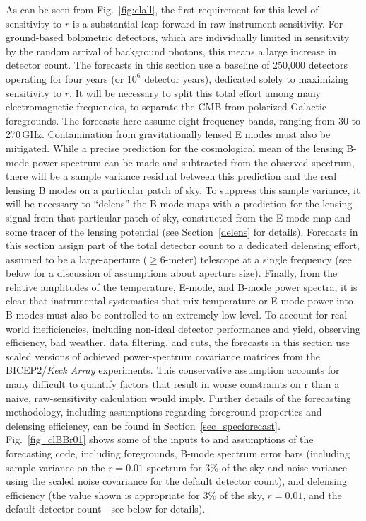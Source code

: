 As can be seen from Fig.~\ref{fig:clall}, the first requirement for this level of sensitivity to $r$ is a substantial leap forward in raw instrument sensitivity. 
For ground-based bolometric detectors, which are individually limited in sensitivity by the random arrival of background photons, this means a large increase in detector count. 
The forecasts in this section use a baseline of 250,000 detectors operating for four years (or $10^6$ detector years), dedicated solely to maximizing sensitivity to $r$. 
It will be necessary to split this total effort among many electromagnetic frequencies, to separate the CMB from polarized Galactic foregrounds. %
The forecasts here assume eight frequency bands, ranging from 30 to 270\,GHz.
Contamination from gravitationally lensed E modes must also be mitigated.
While a precise prediction for the cosmological mean of the lensing B-mode power spectrum can be made and subtracted from the observed spectrum, there will be a sample variance residual between this prediction and the real lensing B modes on a particular patch of sky.
To suppress this sample variance, it will be necessary to ``delens'' the B-mode maps with a prediction for the lensing signal from that particular patch of sky, constructed from the E-mode map and some tracer of the lensing potential (see Section~\ref{delens} for details).
Forecasts in this section assign part of the total detector count to a dedicated delensing effort, assumed to be a large-aperture ($\ge 6$-meter) telescope at a single frequency
(see below for a discussion of assumptions about aperture size).
Finally, from the relative amplitudes of the temperature, E-mode, and B-mode power spectra, it is clear that instrumental systematics that mix temperature or E-mode power into B modes must also be controlled to an extremely low level. 
To account for real-world inefficiencies, including non-ideal detector performance and yield, observing efficiency, bad weather, data filtering, and cuts, the forecasts in this section use scaled versions of achieved power-spectrum covariance matrices from the { BICEP}2/{\em Keck Array} experiments.
This conservative assumption accounts for many difficult to quantify factors that result in worse constraints on r than a naive, raw-sensitivity calculation would imply.
Further details of the forecasting methodology, including assumptions regarding foreground properties and delensing efficiency, can be found in Section~\ref{sec_specforecast}.
Fig.~\ref{fig_clBBr01} shows some of the inputs to and assumptions of the forecasting code, including foregrounds, B-mode spectrum error bars (including sample variance on the $r=0.01$ spectrum for 3\% of the sky and noise variance using the scaled noise covariance for the default detector count), and delensing efficiency (the value shown is appropriate for 3\% of the sky, $r=0.01$, and the default detector count---see below for details).

